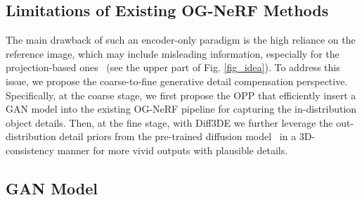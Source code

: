 

\vspace{-2mm}
\subsection{\textbf{Limitations of Existing OG-NeRF Methods}}
\label{sec:ognerf_limit}
The main drawback of such an encoder-only paradigm is the high reliance on the reference image, which 
may include misleading information, especially for the projection-based ones~\cite{PixelNeRF_yu2021pixelnerf,lin2023visionnerf} (see the upper part of Fig. \ref{fig_idea}).
To address this issue, 
we propose the coarse-to-fine generative detail compensation perspective. Specifically, at the coarse stage, we first propose the OPP that efficiently insert a GAN model into the existing OG-NeRF pipeline for capturing the in-distribution object details. Then, at the fine stage, with Diff3DE we further leverage the out-distribution detail priors from the pre-trained diffusion model~\cite{rombach2022LatentDiff,zhang2023addingControlNet} in a 3D-consistency manner for more vivid outputs with plausible details. 


\subsection{\textbf{GAN Model}}
\label{sec:gan_model}

